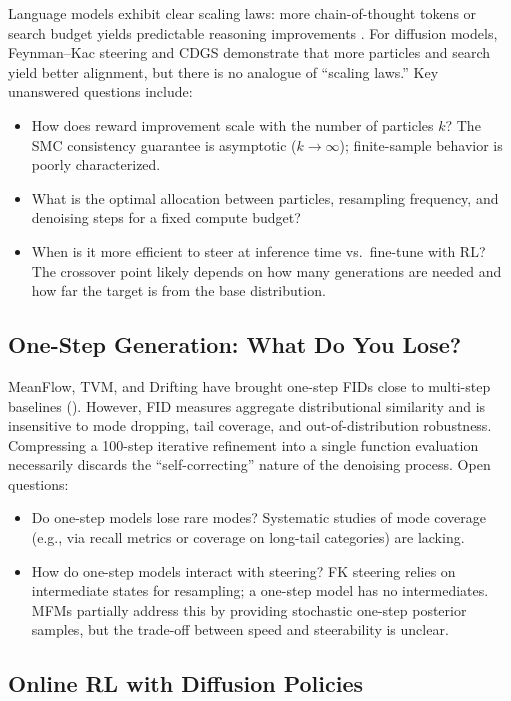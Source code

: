 \documentclass[11pt]{article}
\begin{document}
Language models exhibit clear scaling laws: more chain-of-thought tokens or search budget yields predictable reasoning improvements \citep{snell2024scaling}.
For diffusion models, Feynman--Kac steering and CDGS demonstrate that more particles and search yield better alignment, but there is no analogue of ``scaling laws.''
Key unanswered questions include:
\begin{itemize}
    \item How does reward improvement scale with the number of particles $k$? The SMC consistency guarantee is asymptotic ($k \to \infty$); finite-sample behavior is poorly characterized.
    \item What is the optimal allocation between particles, resampling frequency, and denoising steps for a fixed compute budget?
    \item When is it more efficient to steer at inference time vs.\ fine-tune with RL? The crossover point likely depends on how many generations are needed and how far the target is from the base distribution.
\end{itemize}

\subsection{One-Step Generation: What Do You Lose?}

MeanFlow, TVM, and Drifting have brought one-step FIDs close to multi-step baselines ().
However, FID measures aggregate distributional similarity and is insensitive to mode dropping, tail coverage, and out-of-distribution robustness.
Compressing a 100-step iterative refinement into a single function evaluation necessarily discards the ``self-correcting'' nature of the denoising process.
Open questions:
\begin{itemize}
    \item Do one-step models lose rare modes? Systematic studies of mode coverage (e.g., via recall metrics or coverage on long-tail categories) are lacking.
    \item How do one-step models interact with steering? FK steering relies on intermediate states for resampling; a one-step model has no intermediates. MFMs partially address this by providing stochastic one-step posterior samples, but the trade-off between speed and steerability is unclear.
\end{itemize}

\subsection{Online RL with Diffusion Policies}
\end{document}
